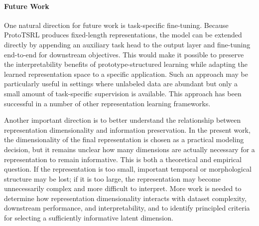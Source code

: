 \documentclass{article}
\begin{document}
\paragraph{Future Work} One natural direction for future work is task-specific fine-tuning. Because ProtoTSRL produces fixed-length representations, the model can be extended directly by appending an auxiliary task head to the output layer and fine-tuning end-to-end for downstream objectives. This would make it possible to preserve the interpretability benefits of prototype-structured learning while adapting the learned representation space to a specific application. Such an approach may be particularly useful in settings where unlabeled data are abundant but only a small amount of task-specific supervision is available. This approach has been successful in a number of other representation learning frameworks. 

Another important direction is to better understand the relationship between representation dimensionality and information preservation. In the present work, the dimensionality of the final representation is chosen as a practical modeling decision, but it remains unclear how many dimensions are actually necessary for a representation to remain informative. This is both a theoretical and empirical question. If the representation is too small, important temporal or morphological structure may be lost; if it is too large, the representation may become unnecessarily complex and more difficult to interpret. More work is needed to determine how representation dimensionality interacts with dataset complexity, downstream performance, and interpretability, and to identify principled criteria for selecting a sufficiently informative latent dimension.

\newpage
  
  
\end{document}
